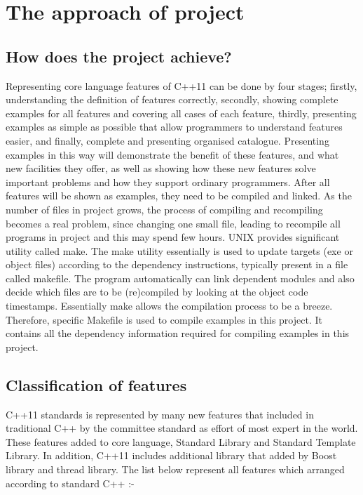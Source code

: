 \documentclass[12pt,a4paper]{report}
\begin{document}
  
 
\chapter{The approach of project}
\section{How does the project achieve?}
\label{secton: how does the project achieve?}
Representing core language features of C++11 can be done by four stages; firstly, understanding the definition of features correctly, secondly, showing complete examples for all features and covering all cases of each feature, thirdly, presenting examples as simple as possible that allow programmers to understand  features easier, and finally, complete and presenting organised catalogue.
\newline
Presenting  examples in this way will  demonstrate the benefit of these features, and what new facilities they offer, as well as showing how these new features solve important problems and how they support ordinary programmers.
\newline
After all features will be shown as examples, they need to be compiled and linked. As the number of files in project grows, the process of compiling and recompiling becomes a real problem, since changing one small file, leading to recompile all programs in project and this may spend few hours.
\newline
UNIX provides significant utility called make. The make utility essentially is used to update targets (exe or object files) according to the dependency instructions, typically present in a file called makefile. The program automatically can link dependent modules and also decide which files are to be (re)compiled by looking at the object code timestamps. Essentially make allows the compilation process to be a breeze.
\newline
Therefore, specific Makefile is used to compile examples in this project. It contains all the dependency information required for compiling examples in this project.



\section{Classification of features}
\label{subsection: overview of features}
C++11 standards is represented by many new features that included in traditional C++ by the committee standard as effort of most expert in the world. These features added  to core language, Standard Library and Standard Template Library. In addition, C++11 includes additional library that added by Boost library and thread library. The list below represent all features which arranged according to standard C++ :-
\end{document}
